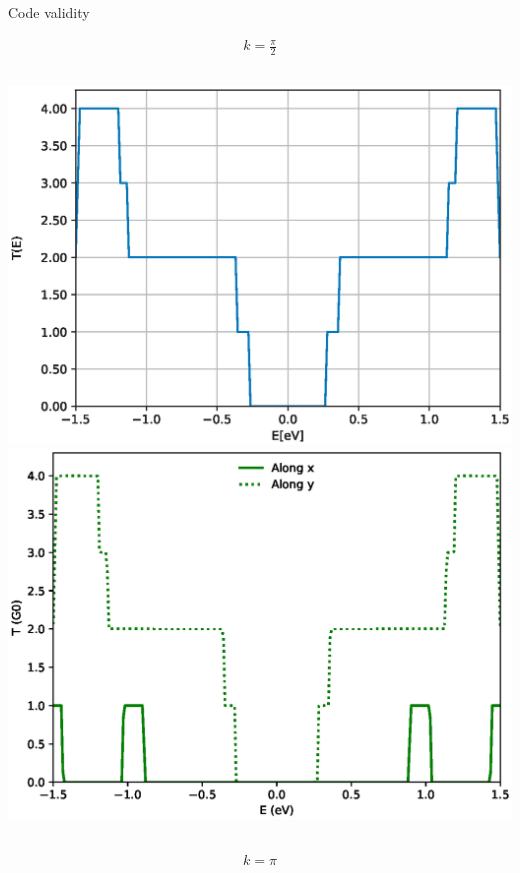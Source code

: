 \documentclass[hyperref={colorlinks=true,urlcolor=blue,linkcolor=.},aspectratio=1610,mathserif]{beamer}
\begin{document}
\begin{frame}{Code validity}
\centering
\begin{overprint}
\centering
\begin{align*}
		k = \frac{\pi}{2}
\end{align*}
\begin{columns}[t]
    \includegraphics[width=\textwidth]{Figures/NPGNormal_pi-half.eps}
    \includegraphics[width=.97\textwidth]{Figures/txy_pi-half.eps}
\end{columns}
\centering
\begin{align*}
		k = \pi
\end{align*}
\begin{columns}[t]

\end{columns}
\end{overprint}
\end{frame}
\end{document}

